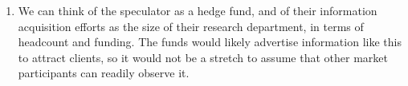 \documentclass[a4paper]{article}
\begin{document}
\begin{enumerate}
	\item We can think of the speculator as a hedge fund, and of their information acquisition efforts as the size of their research department, in terms of headcount and funding. The funds would likely advertise information like this to attract clients, so it would not be a stretch to assume that other market participants can readily observe it.
	
	

\end{enumerate}
\end{document}
